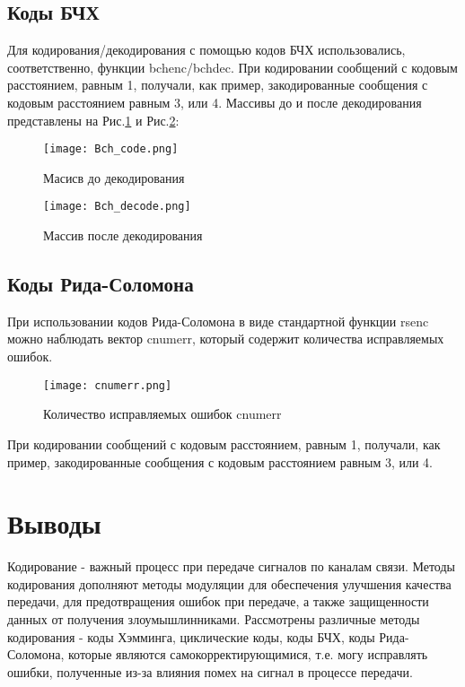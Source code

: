 \subsection{Коды БЧХ}
Для кодирования/декодирования с помощью кодов БЧХ использовались, соответственно, функции bchenc/bchdec.
При кодировании сообщений с кодовым расстоянием, равным 1, получали, как пример, закодированные сообщения с кодовым расстоянием равным 3, или 4.
Массивы до и после декодирования представлены на Рис.\ref{Bch_code} и Рис.\ref{Bch_decode}:
\begin{figure}[H]
	\begin{center}
		\texttt{[image: Bch\_code.png]}
		\caption{Масисв до декодирования} %
		\label{Bch_code} %
	\end{center}
\end{figure}
\begin{figure}[H]
	\begin{center}
		\texttt{[image: Bch\_decode.png]}
		\caption{Массив после декодирования} %
		\label{Bch_decode} %
	\end{center}
\end{figure}

\subsection{Коды Рида-Соломона}
При использовании кодов Рида-Соломона в виде стандартной функции rsenc можно наблюдать вектор cnumerr, который содержит количества исправляемых ошибок.
\begin{figure}[H]
	\begin{center}
		\texttt{[image: cnumerr.png]}
		\caption{Количество исправляемых ошибок cnumerr} %
		\label{cnumerr} %
	\end{center}
\end{figure}
При кодировании сообщений с кодовым расстоянием, равным 1, получали, как пример, закодированные сообщения с кодовым расстоянием равным 3, или 4.

\section{Выводы}
Кодирование - важный процесс при передаче сигналов по каналам связи. Методы кодирования дополняют методы модуляции для обеспечения улучшения качества передачи, для предотвращения ошибок при передаче, а также защищенности данных от получения злоумышлинниками.
Рассмотрены различные методы кодирования - коды Хэмминга, циклические коды, коды БЧХ, коды Рида-Соломона, которые являются самокорректирующимися, т.е. могу исправлять ошибки, полученные из-за влияния помех на сигнал в процессе передачи.


